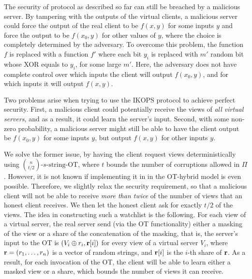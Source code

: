 \documentclass{llncs}
\newcommand{\OT}{\operatorname{OT}}
\newcommand{\bOT}[2]{\binom{#2}{#1}\text{-bit-OT}}
\newcommand{\sOT}[3]{\binom{#2}{#1}\text{-}#3\text{-string-OT}}
\renewcommand{\v}{\myvec{v}}
\begin{document}
The security of protocol as described so far can still be breached by a malicious server. By tampering with the outputs of the virtual clients, a malicious server could force the output of the real client to be $f(x,y)$ for some inputs $y$ and force the output to be $f(x_0,y)$ for other values of $y$, where the choice is completely determined by the adversary. To overcome this problem, the function $f$ is replaced with a function $f'$ where each bit $y_i$ is replaced with $m'$ random bit whose XOR equals to $y_i$, for some large $m'$. Here, the adversary does not have complete control over which inputs the client will output $f(x_0,y)$, and for which inputs it will output $f(x,y)$.

Two problems arise when trying to use the IKOPS protocol to achieve perfect security. First, a malicious client could potentially receive the views of \emph{all virtual servers}, and as a result, it could learn the server's input. Second, with some non-zero probability, a malicious server might still be able to have the client output be $f(x_0,y)$ for some inputs $y$, but output $f(x,y)$ for other inputs $y$.

We solve the former issue, by having the client request views deterministically using $\sOT{t/2}{n}{s}$, where  $t$ bounds the number of corruptions allowed in $\Pi$. However, it is not known if implementing it in in the OT-hybrid model is even possible. Therefore, we slightly relax the security requirement, so that a malicious client will not be able to receive \emph{more than twice} of the number of views that an honest client receives. We then let the honest client ask for exactly $t/2$ of the views. The idea in constructing such a watchlist is the following. For each view of a virtual server, the real server send (via the OT functionality) either a masking of the view or a share of the concatenation of the masking, that is, the server's input to the OT is $(V_i\oplus r_i,{\bf r}[i])$ for every view of a virtual server $V_i$, where ${\bf r}=\left ( r_1,\ldots,r_n \right )$ is a vector of random strings, and ${\bf r}[i]$ is the $i$-th share of ${\bf r}$. As a result, for each invocation of the OT, the client will be able to learn either a masked view or a share, which bounds the number of views it can receive.
\end{document}
